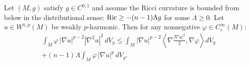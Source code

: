 \begin{theorem}\label{thm:DistrWeightedBochner}
Let $(M, g)$ satisfy $g \in C^{0,1}$ and assume the Ricci curvature is bounded from below in the distributional sense: $\mathrm{Ric} \ge -(n-1)\Lambda g$ for some $\Lambda \ge 0$. Let $u \in W^{1,p}(M)$ be weakly $p$-harmonic. Then for any nonnegative $\varphi \in C^\infty_c(M)$:
\begin{multline}\label{eq:DistrBochnerFull}
    \int_M \varphi \, |\nabla u|^{p-2} |\nabla^2 u|^2 \, dV_g \le \int_M |\nabla u|^{p-2} \left\langle \nabla \frac{|\nabla u|^2}{2}, \nabla \varphi \right\rangle dV_g \\
    + (n-1)\Lambda \int_M \varphi \, |\nabla u|^p \, dV_g.
\end{multline}
\end{theorem}

